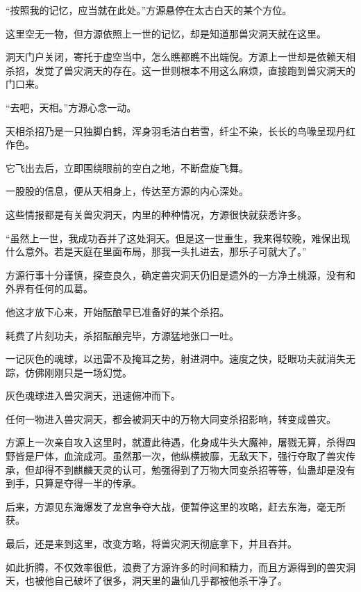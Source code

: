 
\begin{this_body}



“按照我的记忆，应当就在此处。”方源悬停在太古白天的某个方位。

这里空无一物，但方源依照上一世的记忆，却是知道那兽灾洞天就在这里。

洞天门户关闭，寄托于虚空当中，怎么瞧都瞧不出端倪。方源上一世却是依赖天相杀招，发觉了兽灾洞天的存在。这一世则根本不用这么麻烦，直接跑到兽灾洞天的门口来。

“去吧，天相。”方源心念一动。

天相杀招乃是一只独脚白鹤，浑身羽毛洁白若雪，纤尘不染，长长的鸟喙呈现丹红作色。

它飞出去后，立即围绕眼前的空白之地，不断盘旋飞舞。

一股股的信息，便从天相身上，传达至方源的内心深处。

这些情报都是有关兽灾洞天，内里的种种情况，方源很快就获悉许多。

“虽然上一世，我成功吞并了这处洞天。但是这一世重生，我来得较晚，难保出现什么意外。若是天庭在里面布局，那我一头扎进去，那乐子可就大了。”

方源行事十分谨慎，探查良久，确定兽灾洞天仍旧是遗外的一方净土桃源，没有和外界有任何的瓜葛。

他这才放下心来，开始酝酿早已准备好的某个杀招。

耗费了片刻功夫，杀招酝酿完毕，方源猛地张口一吐。

一记灰色的魂球，以迅雷不及掩耳之势，射进洞中。速度之快，眨眼功夫就消失无踪，仿佛刚刚只是一场幻觉。

灰色魂球进入兽灾洞天，迅速俯冲而下。

任何一物进入兽灾洞天，都会被洞天中的万物大同变杀招影响，转变成兽灾。

方源上一次亲自攻入这里时，就遭此待遇，化身成牛头大魔神，屠戮无算，杀得四野皆是尸体，血流成河。虽然那一次，他纵横披靡，无敌天下，强行夺取了兽灾传承，但却得不到麒麟天灵的认可，勉强得到了万物大同变杀招等等，仙蛊却是没有到手，只算是夺得一半的传承。

后来，方源见东海爆发了龙宫争夺大战，便暂停这里的攻略，赶去东海，毫无所获。

最后，还是来到这里，改变方略，将兽灾洞天彻底拿下，并且吞并。

如此折腾，不仅效率很低，浪费了方源许多的时间和精力，而且方源得到的兽灾洞天，也被他自己破坏了很多，洞天里的蛊仙几乎都被他杀干净了。


\end{this_body}
